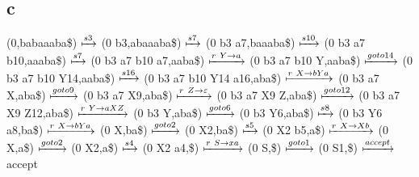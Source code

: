 \documentclass[11pt]{scrartcl}
\begin{document}
	\subsection*{c}
	(0,babaaaba\$) $\xmapsto{s3}$ (0 b3,abaaaba\$) $\xmapsto{s7}$ (0 b3 a7,baaaba\$) $\xmapsto{s10}$ (0 b3 a7 b10,aaaba\$) $\xmapsto{s7}$ (0 b3 a7 b10 a7,aaba\$) $\xmapsto{r\ Y\rightarrow a}$ (0 b3 a7 b10 Y,aaba\$) $\xmapsto{goto 14}$ (0 b3 a7 b10 Y14,aaba\$) $\xmapsto{s16}$ (0 b3 a7 b10 Y14 a16,aba\$) $\xmapsto{r\ X\rightarrow bYa}$ (0 b3 a7 X,aba\$) $\xmapsto{goto 9}$ (0 b3 a7 X9,aba\$) $\xmapsto{r\ Z\rightarrow \varepsilon}$ (0 b3 a7 X9 Z,aba\$) $\xmapsto{goto 12}$ (0 b3 a7 X9 Z12,aba\$) $\xmapsto{r\ Y\rightarrow aXZ}$ (0 b3 Y,aba\$) $\xmapsto{goto 6}$ (0 b3 Y6,aba\$) $\xmapsto{s8}$ (0 b3 Y6 a8,ba\$) $\xmapsto{r\ X\rightarrow bYa}$ (0 X,ba\$) $\xmapsto{goto 2}$ (0 X2,ba\$) $\xmapsto{s5}$ (0 X2 b5,a\$) $\xmapsto{r\ X\rightarrow Xb}$ (0 X,a\$) $\xmapsto{goto 2}$ (0 X2,a\$) $\xmapsto{s4}$ (0 X2 a4,\$) $\xmapsto{r\ S\rightarrow xa}$ (0 S,\$) $\xmapsto{goto 1}$ (0 S1,\$) $\xmapsto{accept}$ accept
\end{document}
